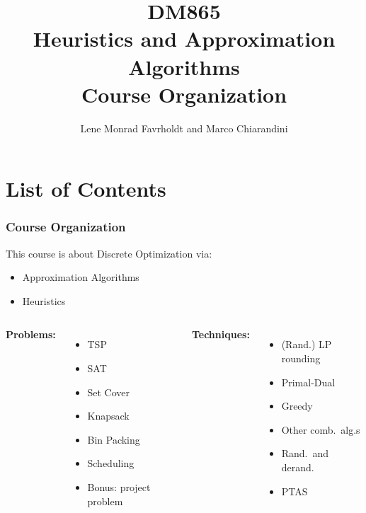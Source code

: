 \documentclass[handout,usepdftitle=false,aspectratio=169,smaller,compress,sans,fleqn,xcolor=dvipsnames,fleqn,table]{beamer}
\title{{\color{black}\normalfont\small DM865}\\
{\color{black}\normalfont\small Heuristics and Approximation Algorithms}\\[2em]
%
Course Organization}
\author{Lene Monrad Favrholdt and Marco Chiarandini}
\date{}
\begin{document}
\frame[plain]{%
\titlepage


}
%
%
%


\section{List of Contents}

\begin{frame}%
  \frametitle{Course Organization}

This course is about Discrete Optimization via:
\begin{itemize}

\item Approximation Algorithms
\item Heuristics 
\end{itemize}

\medskip

\pause
\begin{columns}[T,onlytextwidth]
\textbf{Problems:}

\begin{itemize}
  \itemsep=1ex
\item TSP
\item SAT
\item Set Cover
\item Knapsack
\item Bin Packing
\item Scheduling
\item Bonus: project problem
  \end{itemize}


\textbf{Techniques:} 

\begin{itemize}
  \itemsep=1ex
\item (Rand.) LP rounding
\item Primal-Dual
\smallskip
\item Greedy
\item Other comb.\ alg.s
\smallskip
\item Rand.\ and derand.
\smallskip
\item PTAS
\end{itemize}


\end{columns}
\end{frame}
\end{document}
